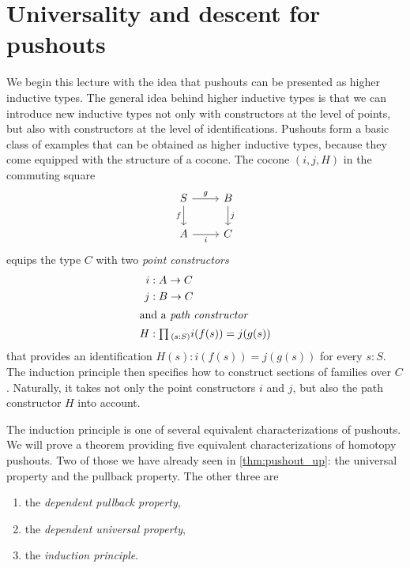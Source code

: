 \section{Universality and descent for pushouts}\label{chap:descent}

We begin this lecture with the idea that pushouts can be presented as higher inductive types. The general idea behind higher inductive types is that we can introduce new inductive types not only with constructors at the level of points, but also with constructors at the level of identifications. Pushouts form a basic class of examples that can be obtained as higher inductive types, because they come equipped with the structure of a cocone. The cocone $(i,j,H)$ in the commuting square
\begin{equation*}
  \begin{tikzcd}
    S \arrow[r,"g"] \arrow[d,swap,"f"] & B \arrow[d,"j"] \\
    A \arrow[r,swap,"i"] & C
  \end{tikzcd}
\end{equation*}
equips the type $C$ with two \emph{point constructors}
\begin{align*}
  i & : A \to C \\
  j & : B \to C \\
  \intertext{and a \emph{path constructor}}
  H & : \prd{s:S}i(f(s)) = j(g(s))
\end{align*}
that provides an identification $H(s):i(f(s))=j(g(s))$ for every $s:S$. The induction principle then specifies how to construct sections of families over $C$. Naturally, it takes not only the point constructors $i$ and $j$, but also the path constructor $H$ into account. 

The induction principle is one of several equivalent characterizations of pushouts. We will prove a theorem providing five equivalent characterizations of homotopy pushouts. Two of those we have already seen in \cref{thm:pushout_up}: the universal property and the pullback property. The other three are
\begin{enumerate}
\item the \emph{dependent pullback property},
\item the \emph{dependent universal property},
\item the \emph{induction principle}.
\end{enumerate}

